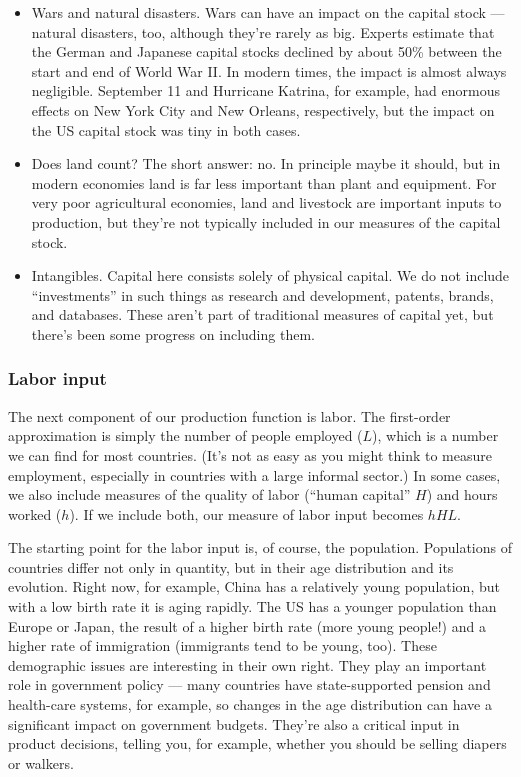 \documentclass[letterpaper,12pt]{article}
\begin{document}
\begin{itemize}
\item Wars and natural disasters.
Wars can have an impact on the capital stock --- natural disasters, too,
although they're rarely as big.
Experts estimate that the German and Japanese capital stocks declined
by about 50\%  between the start and end of World War II.
In modern times, the impact is almost always negligible.
September 11 and Hurricane Katrina, for example, had
enormous effects on New York City and New Orleans, respectively,
but the impact on the US capital stock was tiny in both cases.

\item Does land count?  The short answer:  no.
In principle maybe it should, but in modern economies land is far less important
than plant and equipment.
For very poor agricultural economies, land and livestock are important
inputs to production, but they're not typically included in our
measures of the capital stock.

\item Intangibles.
Capital here consists solely of physical capital.
We do not include ``investments'' in such things
as research and development, patents, brands, and databases.
These aren't part of traditional measures of capital yet,
but there's been some progress on including them.

\end{itemize}



\subsubsection*{Labor input}

The next component of our production function is labor.
The first-order approximation is simply the number of people employed ($L$),
which is a number we can find for most countries.
(It's not as easy as you might think to measure employment,
especially in countries with a large informal sector.)
In some cases, we also include measures of the quality of labor
(``human capital'' $H$) and hours worked ($h$).
If we include both, our measure of labor input becomes
$hHL$.


The starting point for the labor input is, of course, the population.
Populations of countries differ not only in quantity,
but in their age distribution and its evolution.
Right now, for example, China has a relatively young population,
but with a low birth rate it is aging rapidly.
The US has a younger population than Europe or Japan,
the result of a higher birth rate (more young people!)
and a higher rate of immigration (immigrants tend to be young, too).
These demographic issues are interesting in their own right.
They play an important role in government policy ---
many countries have state-supported pension and health-care systems,
for example, so changes in the age distribution can have
a significant impact on government budgets.
They're also a critical input in product decisions,
telling you, for example, whether you should be selling
diapers or walkers.
\end{document}
